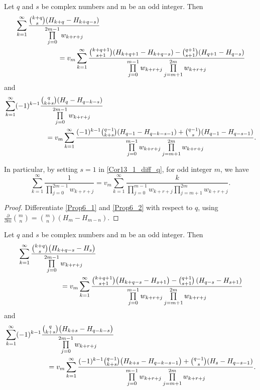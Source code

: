 \documentclass[12pt,reqno]{article}
\begin{document}
\begin{corollary} Let $q$ and $s$ be complex numbers and m be an odd integer. Then
\begin{align}
		&\sum_{k = 1}^\infty  \frac{\binom{k+q}{s}(H_{k+q}-H_{k+q-s})}{\prod\limits_{j = 0}^{2m - 1} w_{k + r + j}} \notag \\
		&\qquad\qquad\qquad  = v_m \sum_{k = 1}^\infty 
		\frac{\binom{k+q+1}{s+1}(H_{k+q+1}-H_{k+q-s})- \binom{q+1}{s+1}(H_{q+1}-H_{q-s})}{\prod\limits_{j = 0}^{m - 1} {w_{k + r + j} }\prod\limits_{j = m + 1}^{2m} {w_{k + r + j} } }\label{Cor13_1_diff_q}
		\end{align}
	and
		\begin{align}
		&\sum_{k = 1}^\infty (-1)^{k-1}
		\frac{
			\binom{q}{k+s}
			(H_q-H_{q-k-s})}
		{\prod\limits_{j = 0}^{2m - 1} w_{k+r+j}}\notag \\
		&\qquad\qquad\qquad=v_m
		\sum_{k = 1}^\infty
		\frac{(-1)^{k-1}
			\binom{q-1}{k+s}
			(H_{q-1}-H_{q-k-s-1}) +
			\binom{q-1}{s}
			(H_{q-1}-H_{q-s-1})}
		{\prod\limits_{j = 0}^{m - 1} w_{k+r+j}
			\prod\limits_{j = m + 1}^{2m} w_{k+r+j}
		}.
		\label{Cor13_2_diff_q}
		\end{align}
	
	In particular, by setting $s=1$ in  \eqref{Cor13_1_diff_q}, for odd integer $m$, we have 
			\begin{equation*}
		\sum_{k = 1}^\infty  \frac{1}{\prod\limits_{j = 0}^{2m - 1} w_{k + r + j}} = v_m \sum_{k = 1}^\infty 
		\frac{k}{\prod\limits_{j = 0}^{m - 1} {w_{k + r + j} }\prod\limits_{j = m + 1}^{2m} {w_{k + r + j} }}.
		\end{equation*}
		\begin{proof}
		Differentiate  \eqref{Prop6_1} and \eqref{Prop6_2} with respect to $q$, using  
		$\frac{\partial}{\partial m}\binom{m}{n}=\binom{m}{n}(H_m-H_{m-n}).$
	\end{proof}
\end{corollary}
\begin{corollary} Let $q$ and $s$ be complex numbers and m be an odd integer. Then
	\begin{align}\label{Cor9_1}
		&\sum_{k=1}^{\infty} \frac{\binom{k+q}{s} \big( H_{k+q-s} - H_{s} \big)}{\prod\limits_{j=0}^{2m-1} w_{k+r+j}}\notag\\
		&\qquad\qquad\qquad= v_m \sum_{k=1}^{\infty} \frac{ \binom{k+q+1}{s+1} \big( H_{k+q-s} - H_{s+1} \big) - \binom{q+1}{s+1} \left( H_{q-s} - H_{s+1} \right) }{\prod\limits_{j=0}^{m-1} w_{k+r+j} \prod\limits_{j=m+1}^{2m} w_{k+r+j}}
		\end{align}
	and 
\begin{align}\label{Cor9_2}
		&\sum_{k=1}^{\infty} (-1)^{k-1}\frac{ \binom{q}{k+s} \big( H_{k+s} - H_{q-k-s} \big)}{\prod\limits_{j=0}^{2m-1} w_{k+r+j}}\notag \\
		&\qquad\qquad\qquad= v_m \sum_{k=1}^{\infty} \frac{ (-1)^{k-1}\binom{q-1}{k+s} \big( H_{k+s} - H_{q-k-s-1} \big) + \binom{q-1}{s} ( H_{s} - H_{q-s-1} )}{\prod\limits_{j=0}^{m-1} w_{k+r+j} \prod\limits_{j=m+1}^{2m} w_{k+r+j}} .
		\end{align}
	\end{corollary}
\end{document}

